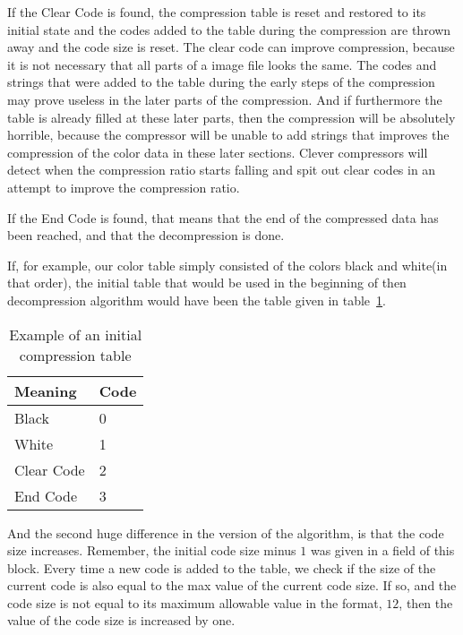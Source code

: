 If the Clear Code is found, the compression table is reset and
restored to its initial state and the codes added to the table during
the compression are thrown away and the code size is reset. The clear
code can improve compression, because it is not necessary that all
parts of a image file looks the same. The codes and strings that were
added to the table during the early steps of the compression may prove
useless in the later parts of the compression. And if furthermore the
table is already filled at these later parts, then the compression
will be absolutely horrible, because the compressor will be unable to
add strings that improves the compression of the color data in these
later sections. Clever \gif compressors will detect when the
compression ratio starts falling and spit out clear codes in an
attempt to improve the compression ratio.

If the End Code is found, that means that the end of the compressed
data has been reached, and that the decompression is done.

If, for example, our color table simply consisted of the colors black
and white(in that order), the initial table that would be used in the
beginning of then decompression algorithm would have been the table
given in table~\ref{tab:example-gif-color-table}.

\begin{table}
  \centering
  \begin{tabular}{ll}
    \toprule
    Meaning & Code \\
    \midrule
    Black & 0 \\
    White & 1 \\
    Clear Code & 2 \\
    End Code & 3 \\
    \bottomrule
  \end{tabular}
  \caption{Example of an initial \gif compression table}
  \label{tab:example-gif-color-table}
\end{table}

And the second huge difference in the \gif version of the \lzw
algorithm, is that the code size increases. Remember, the initial code
size minus $1$ was given in a field of this block. Every time a new
code is added to the table, we check if the size of the current code
is also equal to the max value of the current code size. If so, and
the code size is not equal to its maximum allowable value in the \gif
format, $12$, then the value of the code size is increased by one.

